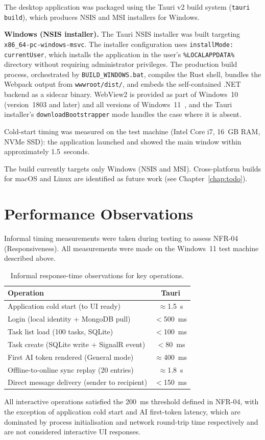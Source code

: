 The desktop application was packaged using the Tauri v2 build system
(\texttt{tauri build}), which produces NSIS and MSI installers for Windows.

\textbf{Windows (NSIS installer).}
The Tauri NSIS installer was built targeting \texttt{x86\_64-}\cbrk\texttt{pc-windows-msvc}.
The installer configuration uses \texttt{installMode: currentUser}, which
installs the application in the user's \texttt{\%LOCALAPPDATA\%} directory
without requiring administrator privileges.
The production build process, orchestrated by \texttt{BUILD\_WINDOWS.bat},
compiles the Rust shell, bundles the Webpack output from
\texttt{wwwroot/dist/}, and embeds the self-contained .NET backend as a sidecar
binary.
WebView2 is provided as part of Windows~10 (version~1803 and later) and all
versions of Windows~11~\cite{webview2}, and the Tauri installer's
\texttt{downloadBootstrapper} mode handles the case where it is absent.

Cold-start timing was measured on the test machine (Intel Core i7, 16~GB RAM,
NVMe SSD): the application launched and showed the main window within
approximately 1.5~seconds.

The build currently targets only Windows (NSIS and MSI).
Cross-platform builds for macOS and Linux are identified as future work
(see Chapter~\ref{chap:todo}).

\section{Performance Observations}\label{sec:res_performance}

Informal timing measurements were taken during testing to assess NFR-04 (Responsiveness).
All measurements were made on the Windows~11 test machine described above.

\begin{table}[H]
\centering
\caption{Informal response-time observations for key operations.}
\label{tab:perf_timings}
\begin{tabular}{lc}
\toprule
\textbf{Operation} &
\textbf{Tauri} \\
\midrule
Application cold start (to UI ready)             & $\approx$1.5~s \\
Login (local identity + MongoDB pull)            & $<$500~ms \\
Task list load (100 tasks, SQLite)               & $<$100~ms \\
Task create (SQLite write + SignalR event)        & $<$80~ms \\
First AI token rendered (General mode)           & $\approx$400~ms \\
Offline-to-online sync replay (20 entries)       & $\approx$1.8~s \\
Direct message delivery (sender to recipient)    & $<$150~ms \\
\bottomrule
\end{tabular}
\end{table}

All interactive operations satisfied the 200~ms threshold defined in NFR-04,
with the exception of application cold start and AI first-token
latency, which are dominated by process initialisation and network round-trip
time respectively and are not considered interactive UI responses.
